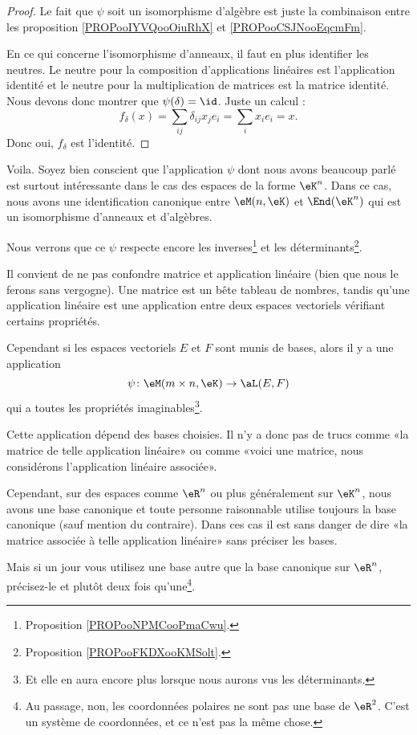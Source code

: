 \begin{proof}
    Le fait que \( \psi\) soit un isomorphisme d'algèbre est juste la combinaison entre les proposition \ref{PROPooIYVQooOiuRhX} et \ref{PROPooCSJNooEqcmFm}.

    En ce qui concerne l'isomorphisme d'anneaux, il faut en plus identifier les neutres. Le neutre pour la composition d'applications linéaires est l'application identité et le neutre pour la multiplication de matrices est la matrice identité. Nous devons donc montrer que \( \psi(\delta)=\id\). Juste un calcul :
    \begin{equation}
        f_{\delta}(x)=\sum_{ij}\delta_{ij}x_je_i=\sum_ix_ie_i=x.
    \end{equation}
    Donc oui, \( f_{\delta}\) est l'identité.
\end{proof}

Voila. Soyez bien conscient que l'application \( \psi\) dont nous avons beaucoup parlé est surtout intéressante dans le cas des espaces de la forme \( \eK^n\). Dans ce cas, nous avons une identification canonique entre \( \eM(n,\eK)\) et \( \End(\eK^n)\) qui est un isomorphisme d'anneaux et d'algèbres.

Nous verrons que ce \( \psi\) respecte encore les inverses\footnote{Proposition \ref{PROPooNPMCooPmaCwu}.} et les déterminants\footnote{Proposition \ref{PROPooFKDXooKMSolt}.}.

\begin{normaltext}
    Il convient de ne pas confondre matrice et application linéaire (bien que nous le ferons sans vergogne). Une matrice est un bête tableau de nombres, tandis qu'une application linéaire est une application entre deux espaces vectoriels vérifiant certains propriétés.

    Cependant si les espaces vectoriels \( E\) et \( F\) sont munis de bases, alors il y a une application
    \begin{equation}
        \psi\colon \eM(m\times n,\eK)\to \aL(E,F)
    \end{equation}
    qui a toutes les propriétés imaginables\footnote{Et elle en aura encore plus lorsque nous aurons vus les déterminants.}.

    Cette application dépend des bases choisies. Il n'y a donc pas de trucs comme «la matrice de telle application linéaire» ou comme «voici une matrice, nous considérons l'application linéaire associée». 

    Cependant, sur des espaces comme \( \eR^n\) ou plus généralement sur \( \eK^n\), nous avons une base canonique et toute personne raisonnable utilise toujours la base canonique (sauf mention du contraire). Dans ces cas il est sans danger de dire «la matrice associée à telle application linéaire» sans préciser les bases.

    Mais si un jour vous utilisez une base autre que la base canonique sur \( \eR^n\), précisez-le et plutôt deux fois qu'une\footnote{Au passage, non, les coordonnées polaires ne sont pas une base de \( \eR^2\). C'est un système de coordonnées, et ce n'est pas la même chose.}.
\end{normaltext}

